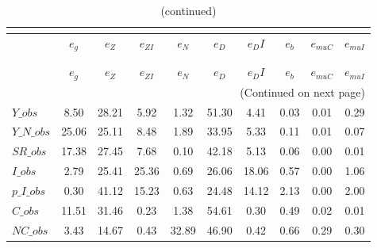  
\begin{center}
\begin{longtable}{lccccccccc} 
\caption{VARIANCE DECOMPOSITION (in percent)}\\
 \label{Table:th_var_decomp_uncond}\\
\toprule 
$               $	 & 	 $        {e_g}$	 & 	 $        {e_Z}$	 & 	 $     {e_{ZI}}$	 & 	 $        {e_N}$	 & 	 $        {e_D}$	 & 	 $       {e_DI}$	 & 	 $        {e_b}$	 & 	 $    {e_{muC}}$	 & 	 $    {e_{muI}}$\\
\midrule \endfirsthead 
\caption{(continued)}\\
 \toprule \\ 
$               $	 & 	 $        {e_g}$	 & 	 $        {e_Z}$	 & 	 $     {e_{ZI}}$	 & 	 $        {e_N}$	 & 	 $        {e_D}$	 & 	 $       {e_DI}$	 & 	 $        {e_b}$	 & 	 $    {e_{muC}}$	 & 	 $    {e_{muI}}$\\
\midrule \endhead 
\midrule \multicolumn{10}{r}{(Continued on next page)} \\ \bottomrule \endfoot 
\bottomrule \endlastfoot 
$Y\_obs         $	 & 	         8.50	 & 	        28.21	 & 	         5.92	 & 	         1.32	 & 	        51.30	 & 	         4.41	 & 	         0.03	 & 	         0.01	 & 	         0.29 \\ 
$Y\_N\_obs      $	 & 	        25.06	 & 	        25.11	 & 	         8.48	 & 	         1.89	 & 	        33.95	 & 	         5.33	 & 	         0.11	 & 	         0.01	 & 	         0.07 \\ 
$SR\_obs        $	 & 	        17.38	 & 	        27.45	 & 	         7.68	 & 	         0.10	 & 	        42.18	 & 	         5.13	 & 	         0.06	 & 	         0.00	 & 	         0.01 \\ 
$I\_obs         $	 & 	         2.79	 & 	        25.41	 & 	        25.36	 & 	         0.69	 & 	        26.06	 & 	        18.06	 & 	         0.57	 & 	         0.00	 & 	         1.06 \\ 
$p\_I\_obs      $	 & 	         0.30	 & 	        41.12	 & 	        15.23	 & 	         0.63	 & 	        24.48	 & 	        14.12	 & 	         2.13	 & 	         0.00	 & 	         2.00 \\ 
$C\_obs         $	 & 	        11.51	 & 	        31.46	 & 	         0.23	 & 	         1.38	 & 	        54.61	 & 	         0.30	 & 	         0.49	 & 	         0.02	 & 	         0.01 \\ 
$NC\_obs        $	 & 	         3.43	 & 	        14.67	 & 	         0.43	 & 	        32.89	 & 	        46.90	 & 	         0.42	 & 	         0.66	 & 	         0.29	 & 	         0.30 \\ 

\end{longtable}
\end{center}
